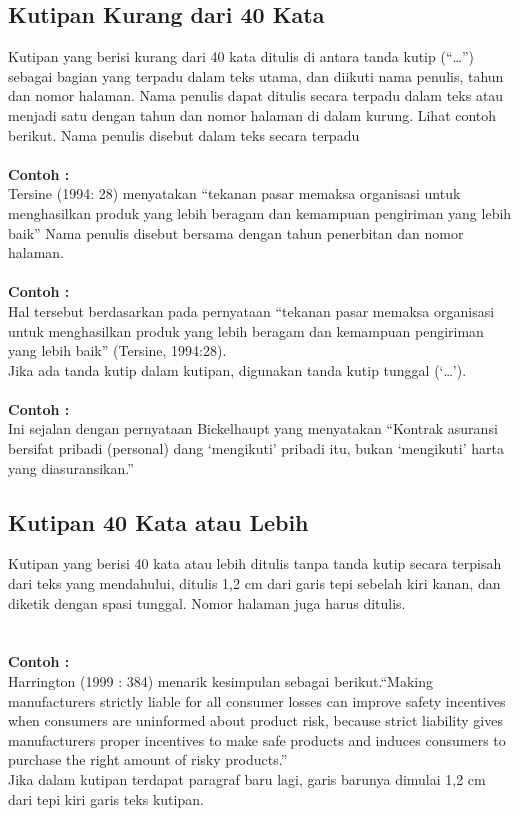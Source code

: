 \subsection{Kutipan	Kurang	dari	40	Kata}
Kutipan	 yang	 berisi	 kurang	 dari	 40	 kata	 ditulis	 di	 antara	 tanda	 kutip	 (“…”)	 sebagai	bagian	 yang	 terpadu	 dalam	 teks	 utama,	 dan	 diikuti	 nama	 penulis,	 tahun	 dan	 nomor	halaman.	 Nama	 penulis	 dapat	 ditulis	 secara	 terpadu	 dalam	 teks	 atau	 menjadi	 satu	dengan	tahun	dan	nomor	halaman	di	dalam	kurung.	Lihat	contoh	berikut. Nama	penulis disebut	dalam	teks	secara	terpadu \\
\\

\textbf{Contoh :}\\
Tersine	 (1994:	 28)	 menyatakan	 “tekanan	 pasar	 memaksa	 organisasi	 untuk	menghasilkan	produk	yang	lebih	beragam	dan	kemampuan	pengiriman	yang	lebih	baik” Nama	penulis	disebut	bersama	dengan	tahun	penerbitan	dan	nomor	halaman.
\\
\\

\textbf{Contoh :}\\
Hal	 tersebut	 berdasarkan	 pada	 pernyataan	 “tekanan	 pasar	memaksa	 organisasi	 untuk	menghasilkan	produk	yang	lebih	beragam	dan	kemampuan	pengiriman	yang	lebih	baik”	
(Tersine,	1994:28). \\
Jika	ada	tanda	kutip	dalam	kutipan,	digunakan	tanda kutip	tunggal	(‘…’).
\\
\\

\textbf{Contoh :}\\
Ini	sejalan	dengan	pernyataan	Bickelhaupt	yang	menyatakan	“Kontrak	asuransi	bersifat	pribadi	 (personal)	 dang	 ‘mengikuti’	 pribadi	 itu,	 bukan	 ‘mengikuti’	 harta	 yang	diasuransikan.”

\subsection{Kutipan	40	Kata	atau	Lebih}
Kutipan	yang	berisi	40	kata	atau	lebih	ditulis	tanpa	tanda	kutip	secara	terpisah	dari	teks	yang	mendahului,	 ditulis	 1,2	 cm	 dari	 garis	 tepi	 sebelah	 kiri	 kanan,	 dan	 diketik	 dengan	spasi	tunggal.	Nomor	halaman	juga	harus	ditulis.
\\
\\
\\
\textbf{Contoh :}\\
Harrington	 (1999	 :	 384)	 menarik	 kesimpulan	 sebagai	 berikut.“Making	 manufacturers	strictly	liable	for	all	consumer	losses	can	improve	safety	incentives	when	consumers	are	
uninformed	 about	 product	 risk,	 because	 strict	 liability	 gives	 manufacturers	 proper	incentives	 to	make	safe	products	and	induces	consumers	 to	purchase	 the	right	amount	of	risky	products.” \\
Jika	dalam	kutipan	 terdapat	paragraf	baru	lagi,	garis	barunya	dimulai	1,2	cm	dari	 tepi	
kiri	garis	teks	kutipan.

